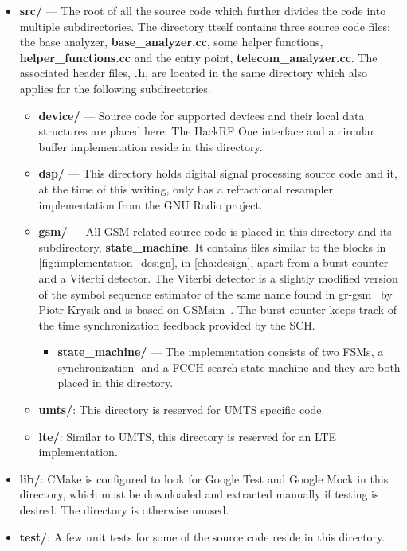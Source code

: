 \begin{itemize}
\item \textbf{src/} --- The root of all the source code which further
  divides the code into multiple subdirectories. The directory ttself
  contains three source code files; the base analyzer,
  \textbf{base\_analyzer.cc}, some helper functions,
  \textbf{helper\_functions.cc} and the entry point,
  \textbf{telecom\_analyzer.cc}. The associated header files,
  \textbf{.h}, are located in the same directory which also applies
  for the following subdirectories.

  \begin{itemize}
  \item \textbf{device/} --- Source code for supported devices and
    their local data structures are placed here. The HackRF One
    interface and a circular buffer implementation reside in this
    directory.

  \item \textbf{dsp/} --- This directory holds digital signal
    processing source code and it, at the time of this writing, only
    has a refractional resampler implementation from the GNU Radio
    project.

  \item \textbf{gsm/} --- All \gls{GSM} related source code is placed
    in this directory and its subdirectory,
    \textbf{state\_machine}. It contains files similar to the blocks
    in \cref{fig:implementation_design}, in \cref{cha:design}, apart
    from a burst counter and a Viterbi detector. The Viterbi detector
    is a slightly modified version of the symbol sequence estimator of
    the same name found in gr-gsm~\cite{grgsm} by Piotr Krysik and is
    based on GSMsim~\cite{ekstr1997a}. The burst counter keeps track
    of the time synchronization feedback provided by the \gls{SCH}.

    \begin{itemize}
    \item \textbf{state\_machine/} --- The implementation consists of
      two \glspl{FSM}, a synchronization- and a \gls{FCCH} search
      state machine and they are both placed in this directory.
    \end{itemize}

  \item \textbf{umts/}: This directory is reserved for \gls{UMTS}
    specific code.

  \item \textbf{lte/}: Similar to \gls{UMTS}, this directory is
    reserved for an \gls{LTE} implementation.
  \end{itemize}

\item \textbf{lib/}: CMake is configured to look for Google Test and
  Google Mock in this directory, which must be downloaded and
  extracted manually if testing is desired. The directory is otherwise
  unused.

\item \textbf{test/}: A few unit tests for some of the source code
  reside in this directory.
\end{itemize}



